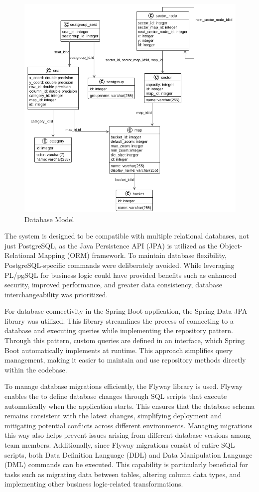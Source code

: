 \begin{figure}
    \centering
    \includegraphics[scale=0.5]{pics/db_model.png}
    \caption{Database Model}
    \label{fig:db_model}
\end{figure}

The system is designed to be compatible with multiple relational databases, not just PostgreSQL, as the Java Persistence API (JPA) is utilized as the Object-Relational Mapping (ORM) framework. To maintain database flexibility, PostgreSQL-specific commands were deliberately avoided. While leveraging PL/pgSQL for business logic could have provided benefits such as enhanced security, improved performance, and greater data consistency, database interchangeability was prioritized.

For database connectivity in the Spring Boot application, the Spring Data JPA library was utilized. This library streamlines the process of connecting to a database and executing queries while implementing the repository pattern. Through this pattern, custom queries are defined in an interface, which Spring Boot automatically implements at runtime. This approach simplifies query management, making it easier to maintain and use repository methods directly within the codebase.

To manage database migrations efficiently, the Flyway library is used. Flyway enables the to define database changes through SQL scripts that execute automatically when the application starts. This ensures that the database schema remains consistent with the latest changes, simplifying deployment and mitigating potential conflicts across different environments. Managing migrations this way also helps prevent issues arising from different database versions among team members. Additionally, since Flyway migrations consist of entire SQL scripts, both Data Definition Language (DDL) and Data Manipulation Language (DML) commands can be executed. This capability is particularly beneficial for tasks such as migrating data between tables, altering column data types, and implementing other business logic-related transformations.

